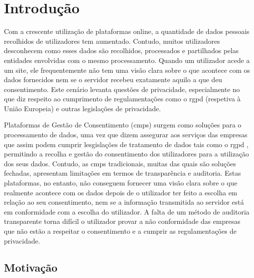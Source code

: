 \label{cap:introducao}
\chapter{Introdução}

Com a crescente utilização de plataformas online, a quantidade de dados pessoais recolhidos de utilizadores tem aumentado. Contudo, muitos utilizadores desconhecem como esses dados são recolhidos, processados e partilhados pelas entidades envolvidas com o mesmo processamento. Quando um utilizador acede a um site, ele frequentemente não tem uma visão clara sobre o que acontece com os dados fornecidos nem se o servidor recebeu exatamente aquilo a que deu consentimento. Este cenário levanta questões de privacidade, especialmente no que diz respeito ao cumprimento de regulamentações como o \acrfull{rgpd} (respetiva à União Europeia) e outras legislações de privacidade.

Plataformas de Gestão de Consentimento (\acrshort{cmp}s) surgem como soluções para o processamento de dados, uma vez que dizem assegurar aos serviços das empresas que assim podem cumprir lesgislações de tratamento de dados tais como o \acrshort{rgpd} \citep{Santos2021}, permitindo a recolha e gestão do consentimento dos utilizadores para a utilização dos seus dados. Contudo, as \acrshort{cmp}s tradicionais, muitas das quais são soluções fechadas, apresentam limitações em termos de transparência e auditoria. 
Estas plataformas, no entanto, não conseguem fornecer uma visão clara sobre o que realmente acontece com os dados depois de o utilizador ter feito a escolha em relação ao seu consentimento, nem se a informação transmitida ao servidor está em conformidade com a escolha do utilizador. A falta de um método de auditoria transparente torna difícil o utilizador provar a não conformidade das empresas que não estão a respeitar o consentimento e a cumprir as regulamentações de privacidade.

\section{Motivação}

